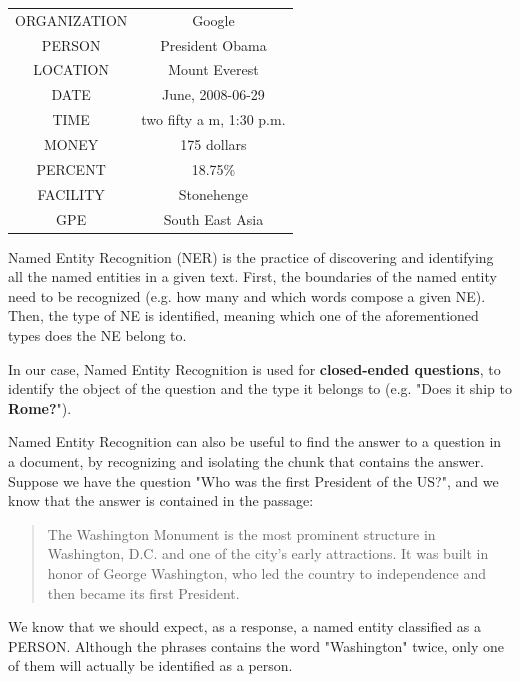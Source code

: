 \documentclass[LaM,oneside,binding=0.6cm]{sapthesis}
\begin{document}
\begin{center}
\begin{tabular}{ c c }
ORGANIZATION &	Google \\
PERSON 	& President Obama \\
LOCATION &	Mount Everest\\
DATE &	June, 2008-06-29\\
TIME &	two fifty a m, 1:30 p.m.\\
MONEY &	175 dollars\\
PERCENT &	18.75\% \\
FACILITY &	Stonehenge\\
GPE &	South East Asia \\
\end{tabular}
\end{center}

Named Entity Recognition (NER) is the practice of discovering and identifying all the named entities in a given text. 
First, the boundaries of the named entity need to be recognized (e.g. how many and which words compose a given NE). Then, the type of NE is identified, meaning which one of the aforementioned types does the NE belong to.

In our case, Named Entity Recognition is used for \textbf{closed-ended questions}, to identify the object of the question and the type it belongs to (e.g. "Does it ship to \textbf{Rome?}").

Named Entity Recognition can also be useful to find the answer to a question in a document, by recognizing and isolating the chunk that contains the answer. Suppose we have the question "Who was the first President of the US?", and we know that the answer is contained in the passage:

\begin{quote}
The Washington Monument is the most prominent structure in Washington, D.C. and one of the city's early attractions. It was built in honor of George Washington, who led the country to independence and then became its first President.
\end{quote}

We know that we should expect, as a response, a named entity classified as a PERSON. Although the phrases contains the word "Washington" twice, only one of them will actually be identified as a person.
\end{document}
